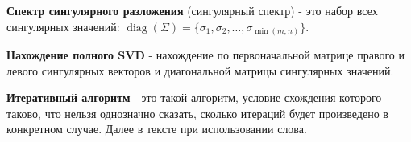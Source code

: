 \hspace{0.45cm} \textbf{Спектр сингулярного разложения} (сингулярный спектр) - это набор всех сингулярных значений: \( \operatorname{diag}(\Sigma) = \{ \sigma_1, \sigma_2, \dots, \sigma_{\min(m, n)} \} \).

\textbf{Нахождение полного SVD} - нахождение по первоначальной матрице правого и левого сингулярных векторов и диагональной матрицы сингулярных значений. 

\textbf{Итеративный алгоритм} - это такой алгоритм, условие схождения которого таково, что нельзя однозначно сказать, сколько итераций будет произведено в конкретном случае. Далее в тексте при использовании слова. 

